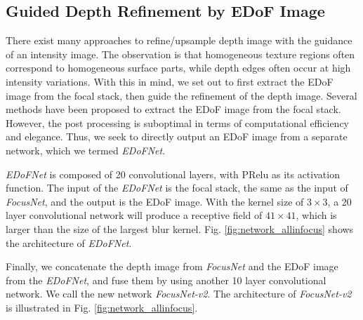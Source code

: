 \documentclass[10pt,twocolumn,letterpaper]{article}
\begin{document}
\subsection{Guided Depth Refinement by EDoF Image}
\label{section:allinfocus}

There exist many approaches \cite{ferstl13, hui16} to refine/upsample depth image with the guidance of an intensity image. The observation is that homogeneous texture regions often correspond to homogeneous surface parts, while depth edges often occur at high intensity variations. With this in mind, we set out to first extract the EDoF image from the focal stack, then guide the refinement of the depth image. Several methods \cite{kuthirummal11, suwajanakorn15} have been proposed to extract the EDoF image from the focal stack. However, the post processing is suboptimal
in terms of computational efficiency and elegance. Thus, we seek to directly output an EDoF image from a separate network, which we termed \emph{EDoFNet}.

\emph{EDoFNet} is composed of 20 convolutional layers, with PRelu as its activation function. The input of the \emph{EDoFNet} is the focal stack, the same as the input of \emph{FocusNet}, and the output is the EDoF image. With the kernel size of $3\times3$, a 20 layer convolutional network will produce a receptive field of $41\times41$, which is larger than the size of the largest blur kernel. Fig. \ref{fig:network_allinfocus} shows the architecture of \emph{EDoFNet}.

Finally, we concatenate the depth image from \emph{FocusNet} and the EDoF image from the \emph{EDoFNet}, and fuse them by using another 10 layer convolutional network. We call the new network \emph{FocusNet-v2}. The architecture of \emph{FocusNet-v2} is illustrated in Fig. \ref{fig:network_allinfocus}.

\end{document}
